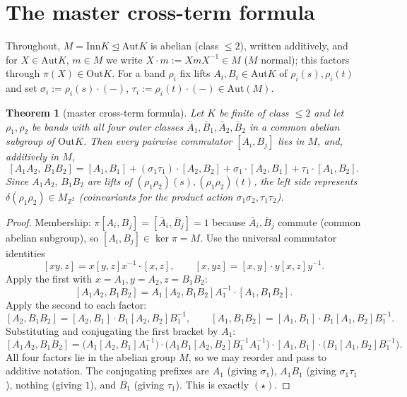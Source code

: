 \documentclass[11pt]{article}
\newtheorem{theorem}{Theorem}
\theoremstyle{definition}
\newcommand{\Z}{\mathbb{Z}}
\newcommand{\Aut}{\mathrm{Aut}}
\newcommand{\Inn}{\mathrm{Inn}}
\newcommand{\Out}{\mathrm{Out}}
\begin{document}
\section{The master cross-term formula}\label{sec:master}

Throughout, $M=\Inn K\trianglelefteq\Aut K$ is abelian (class $\le2$), written
additively, and for $X\in\Aut K$, $m\in M$ we write $X\cdot m:=XmX^{-1}\in M$ ($M$
normal); this factors through $\pi(X)\in\Out K$. For a band $\rho_i$ fix lifts
$A_i,B_i\in\Aut K$ of $\rho_i(s),\rho_i(t)$ and set $\sigma_i:=\rho_i(s)\cdot(-)$,
$\tau_i:=\rho_i(t)\cdot(-)\in\Aut(M)$.

\begin{theorem}[master cross-term formula]\label{thm:master}
Let $K$ be finite of class $\le2$ and let $\rho_1,\rho_2$ be bands with all four outer
classes $\bar A_1,\bar B_1,\bar A_2,\bar B_2$ in a common abelian subgroup of $\Out K$.
Then every pairwise commutator $[A_i,B_j]$ lies in $M$, and, additively in $M$,
\begin{equation}\label{eq:star}
[A_1A_2,\,B_1B_2]=[A_1,B_1]+(\sigma_1\tau_1)\!\cdot\![A_2,B_2]+\sigma_1\!\cdot\![A_2,B_1]+\tau_1\!\cdot\![A_1,B_2].\tag{$\star$}
\end{equation}
Since $A_1A_2,\,B_1B_2$ are lifts of $(\rho_1\rho_2)(s),(\rho_1\rho_2)(t)$, the left
side represents $\delta(\rho_1\rho_2)\in M_{\Z^2}$ (coinvariants for the product action
$\sigma_1\sigma_2,\tau_1\tau_2$).
\end{theorem}

\begin{proof}
Membership: $\pi[A_i,B_j]=[\bar A_i,\bar B_j]=1$ because $\bar A_i,\bar B_j$ commute
(common abelian subgroup), so $[A_i,B_j]\in\ker\pi=M$. Use the universal commutator
identities
\[
[xy,z]=x[y,z]x^{-1}\cdot[x,z],\qquad [x,yz]=[x,y]\cdot y[x,z]y^{-1}.
\]
Apply the first with $x=A_1,y=A_2,z=B_1B_2$:
\[
[A_1A_2,B_1B_2]=A_1[A_2,B_1B_2]A_1^{-1}\cdot[A_1,B_1B_2].
\]
Apply the second to each factor:
\[
[A_2,B_1B_2]=[A_2,B_1]\cdot B_1[A_2,B_2]B_1^{-1},\qquad
[A_1,B_1B_2]=[A_1,B_1]\cdot B_1[A_1,B_2]B_1^{-1}.
\]
Substituting and conjugating the first bracket by $A_1$:
\[
[A_1A_2,B_1B_2]=\big(A_1[A_2,B_1]A_1^{-1}\big)\cdot\big(A_1B_1[A_2,B_2]B_1^{-1}A_1^{-1}\big)\cdot[A_1,B_1]\cdot\big(B_1[A_1,B_2]B_1^{-1}\big).
\]
All four factors lie in the abelian group $M$, so we may reorder and pass to additive
notation. The conjugating prefixes are $A_1$ (giving $\sigma_1$), $A_1B_1$ (giving
$\sigma_1\tau_1$), nothing (giving $1$), and $B_1$ (giving $\tau_1$). This is exactly
$(\star)$.
\end{proof}
\end{document}
